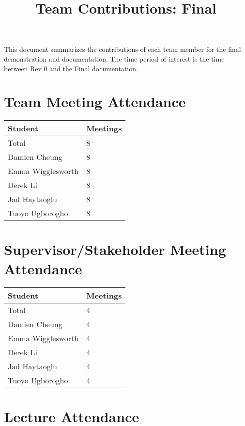 \documentclass{article}
\title{Team Contributions: Final\\\progname}
\author{\authname}
\date{}
\begin{document}
\maketitle

This document summarizes the contributions of each team member for the final
demonstration and documentation.  The time period of interest is the time
between Rev 0 and the Final documentation.

\section{Team Meeting Attendance}

\begin{table}[H]
\centering
\begin{tabular}{ll}
\toprule
\textbf{Student} & \textbf{Meetings}\\
\midrule
Total & 8\\
Damien Cheung & 8\\
Emma Wigglesworth & 8\\
Derek Li & 8\\
Jad Haytaoglu & 8\\
Tuoyo Ugborogho & 8\\
\bottomrule
\end{tabular}
\end{table}

\section{Supervisor/Stakeholder Meeting Attendance}

\begin{table}[H]
\centering
\begin{tabular}{ll}
\toprule
\textbf{Student} & \textbf{Meetings}\\
\midrule
Total & 4\\
Damien Cheung & 4\\
Emma Wigglesworth & 4\\
Derek Li & 4\\
Jad Haytaoglu & 4\\
Tuoyo Ugborogho & 4\\
\bottomrule
\end{tabular}
\end{table}

\section{Lecture Attendance}
\end{document}
